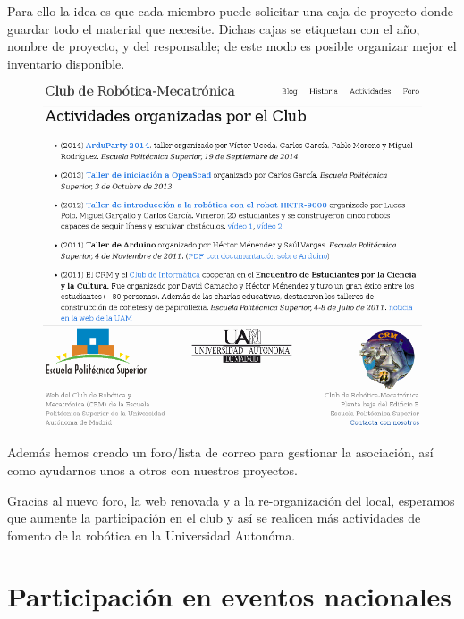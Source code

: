 \documentclass[12pt,twoside]{report}
\begin{document}
Para ello la idea es que cada miembro puede solicitar una caja de proyecto donde guardar todo el material que necesite. Dichas cajas se etiquetan con el año, nombre de proyecto, y del responsable; de este modo es posible organizar mejor el inventario disponible.


\begin{figure}\centering
    \includegraphics[scale=0.3]{fotos/web}
    \caption*{}
\end{figure}

Además hemos creado un foro/lista de correo para gestionar la asociación, así como ayudarnos unos a otros con nuestros proyectos.

Gracias al nuevo foro, la web renovada y a la re-organización del local, esperamos que aumente la participación en el club y así se realicen más actividades de fomento de la robótica en la Universidad Autonóma.




\newpage

\section{Participación en eventos nacionales}
\end{document}
